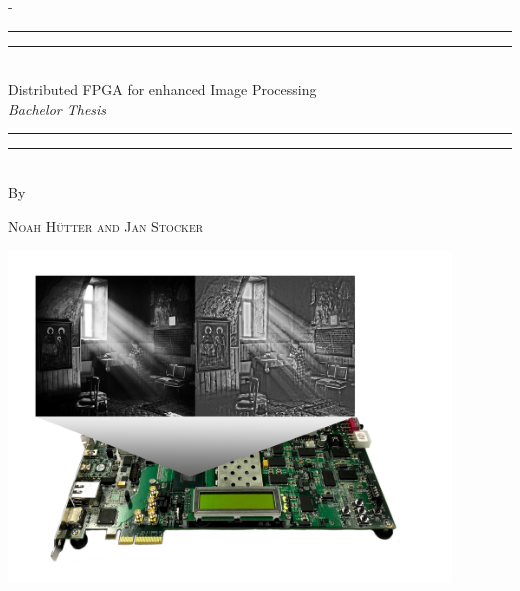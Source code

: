 \begin{titlingpage}
\begin{SingleSpace}
\calccentering{\unitlength} 
\begin{adjustwidth*}{\unitlength}{-\unitlength}
\vspace*{0mm}
\begin{center}
\rule[0.5ex]{\linewidth}{2pt}\vspace*{-\baselineskip}\vspace*{3.2pt}
\rule[0.5ex]{\linewidth}{1pt}\\[\baselineskip]

{\HUGE Distributed FPGA for enhanced Image Processing }\\[4mm]
{\Large \textit{Bachelor Thesis}}\\

\rule[0.5ex]{\linewidth}{1pt}\vspace*{-\baselineskip}\vspace{3.2pt}
\rule[0.5ex]{\linewidth}{2pt}\\
\vspace{2mm}
{\large By}\\
\vspace{2mm}

{\large\textsc{Noah H\"utter and Jan Stocker}}\\

\vspace{7mm}

\includegraphics[width=0.88\textwidth]{images/titlepage/p6_titlepage.png}\\

\vspace{7mm}


\end{center}
\end{adjustwidth*}
\end{SingleSpace}
\end{titlingpage}
